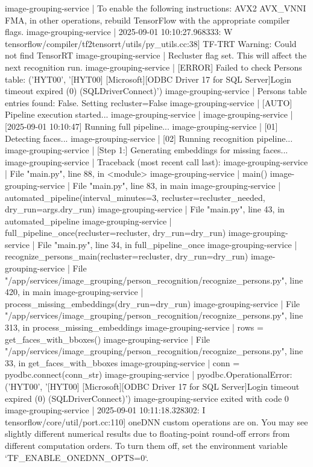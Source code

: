image-grouping-service  | To enable the following instructions: AVX2 AVX_VNNI FMA, in other operations, rebuild TensorFlow with the appropriate compiler flags.
image-grouping-service  | 2025-09-01 10:10:27.968333: W tensorflow/compiler/tf2tensorrt/utils/py_utils.cc:38] TF-TRT Warning: Could not find TensorRT
image-grouping-service  | Recluster flag set. This will affect the next recognition run.
image-grouping-service  | [ERROR] Failed to check Persons table: ('HYT00', '[HYT00] [Microsoft][ODBC Driver 17 for SQL Server]Login timeout expired (0) (SQLDriverConnect)')
image-grouping-service  | Persons table entries found: False. Setting recluster=False
image-grouping-service  | [AUTO] Pipeline execution started...
image-grouping-service  |
image-grouping-service  | [2025-09-01 10:10:47] Running full pipeline...
image-grouping-service  | [01] Detecting faces...
image-grouping-service  | [02] Running recognition pipeline...
image-grouping-service  | [Step 1:] Generating embeddings for missing faces...
image-grouping-service  | Traceback (most recent call last):
image-grouping-service  |   File "main.py", line 88, in <module>
image-grouping-service  |     main()
image-grouping-service  |   File "main.py", line 83, in main
image-grouping-service  |     automated_pipeline(interval_minutes=3, recluster=recluster_needed, dry_run=args.dry_run)
image-grouping-service  |   File "main.py", line 43, in automated_pipeline
image-grouping-service  |     full_pipeline_once(recluster=recluster, dry_run=dry_run)
image-grouping-service  |   File "main.py", line 34, in full_pipeline_once
image-grouping-service  |     recognize_persons_main(recluster=recluster, dry_run=dry_run)
image-grouping-service  |   File "/app/services/image_grouping/person_recognition/recognize_persons.py", line 420, in main
image-grouping-service  |     process_missing_embeddings(dry_run=dry_run)
image-grouping-service  |   File "/app/services/image_grouping/person_recognition/recognize_persons.py", line 313, in process_missing_embeddings
image-grouping-service  |     rows = get_faces_with_bboxes()
image-grouping-service  |   File "/app/services/image_grouping/person_recognition/recognize_persons.py", line 33, in get_faces_with_bboxes
image-grouping-service  |     conn = pyodbc.connect(conn_str)
image-grouping-service  | pyodbc.OperationalError: ('HYT00', '[HYT00] [Microsoft][ODBC Driver 17 for SQL Server]Login timeout expired (0) (SQLDriverConnect)')
image-grouping-service exited with code 0
image-grouping-service  | 2025-09-01 10:11:18.328302: I tensorflow/core/util/port.cc:110] oneDNN custom operations are on. You may see slightly different numerical results due to floating-point round-off errors from different computation orders. To turn them off, set the environment variable `TF_ENABLE_ONEDNN_OPTS=0`.
